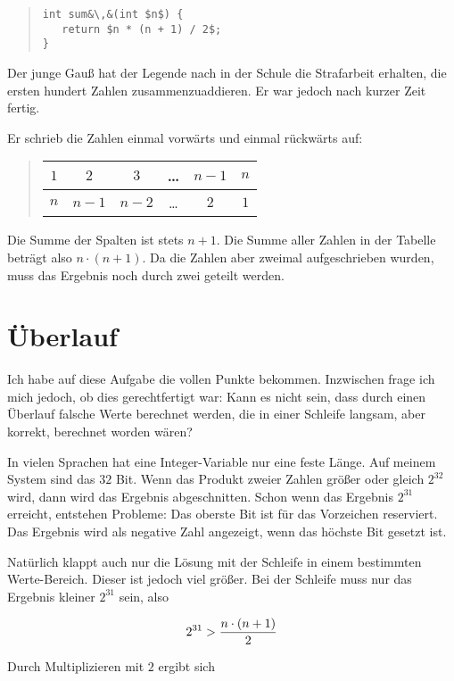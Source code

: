 \documentclass[a5paper,landscape,ngerman,10pt]{article}
\begin{document}
\begin{quotation}
\begin{lstlisting}
int sum&\,&(int $n$) {
   return $n * (n + 1) / 2$;
}
\end{lstlisting}
\end{quotation}

Der junge Gauß hat der Legende nach in der Schule die
Strafarbeit erhalten, die ersten hundert Zahlen
zusammenzuaddieren.
Er war jedoch nach kurzer Zeit fertig.

Er schrieb die Zahlen einmal vorwärts und einmal rückwärts auf:

\begin{quotation}
\begin{tabular}{c|c|c|c|c|c}
$1$&$2$&$3$&\ldots&$n-1$&$n$\\
\hline
$n$&$n-1$&$n-2$&\ldots&$2$&$1$
\end{tabular}
\end{quotation}

Die Summe der Spalten ist stets $n+1$.
Die Summe aller Zahlen in der Tabelle beträgt also $n\cdot(n+1)$.
Da die Zahlen aber zweimal aufgeschrieben wurden, muss das
Ergebnis noch durch zwei geteilt werden.

\section{Überlauf}

Ich habe auf diese Aufgabe die vollen Punkte bekommen.
Inzwischen frage ich mich jedoch, ob dies gerechtfertigt war:
Kann es nicht sein, dass durch einen Überlauf falsche Werte
berechnet werden, die in einer Schleife langsam, aber korrekt,
berechnet worden wären?

In vielen Sprachen hat eine Integer-Variable nur eine feste
Länge.
Auf meinem System sind das $32$ Bit.
Wenn das Produkt zweier Zahlen größer oder gleich $2^{32}$
wird, dann wird das Ergebnis abgeschnitten.
Schon wenn das Ergebnis $2^{31}$ erreicht, entstehen Probleme:
Das oberste Bit ist für das Vorzeichen reserviert.
Das Ergebnis wird als negative Zahl angezeigt, wenn das
höchste Bit gesetzt ist.

Natürlich klappt auch nur die Lösung mit der Schleife in einem
bestimmten Werte-Bereich.
Dieser ist jedoch viel größer.
Bei der Schleife muss nur das Ergebnis kleiner $2^{31}$ sein,
also

\[2^{31} > {n\cdot(n + 1)\over2}\]

Durch Multiplizieren mit $2$ ergibt sich
\end{document}
